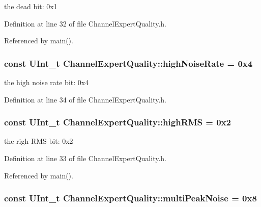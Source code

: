 the dead bit: 0x1 

Definition at line 32 of file ChannelExpertQuality.h.

Referenced by main().\hypertarget{class_channel_expert_quality_a7ec5758ee03b6f11af837adad6b4a676}{
\subsubsection[{highNoiseRate}]{\setlength{\rightskip}{0pt plus 5cm}const UInt\_\-t {\bf ChannelExpertQuality::highNoiseRate} = 0x4}}
\label{class_channel_expert_quality_a7ec5758ee03b6f11af837adad6b4a676}


the high noise rate bit: 0x4 

Definition at line 34 of file ChannelExpertQuality.h.\hypertarget{class_channel_expert_quality_a0b17164b19cdc8619c1a93fe1728c4c3}{
\subsubsection[{highRMS}]{\setlength{\rightskip}{0pt plus 5cm}const UInt\_\-t {\bf ChannelExpertQuality::highRMS} = 0x2}}
\label{class_channel_expert_quality_a0b17164b19cdc8619c1a93fe1728c4c3}


the righ RMS bit: 0x2 

Definition at line 33 of file ChannelExpertQuality.h.

Referenced by main().\hypertarget{class_channel_expert_quality_a13046f6e61373f907a79326530ee2e07}{
\subsubsection[{multiPeakNoise}]{\setlength{\rightskip}{0pt plus 5cm}const UInt\_\-t {\bf ChannelExpertQuality::multiPeakNoise} = 0x8}}
\label{class_channel_expert_quality_a13046f6e61373f907a79326530ee2e07}


